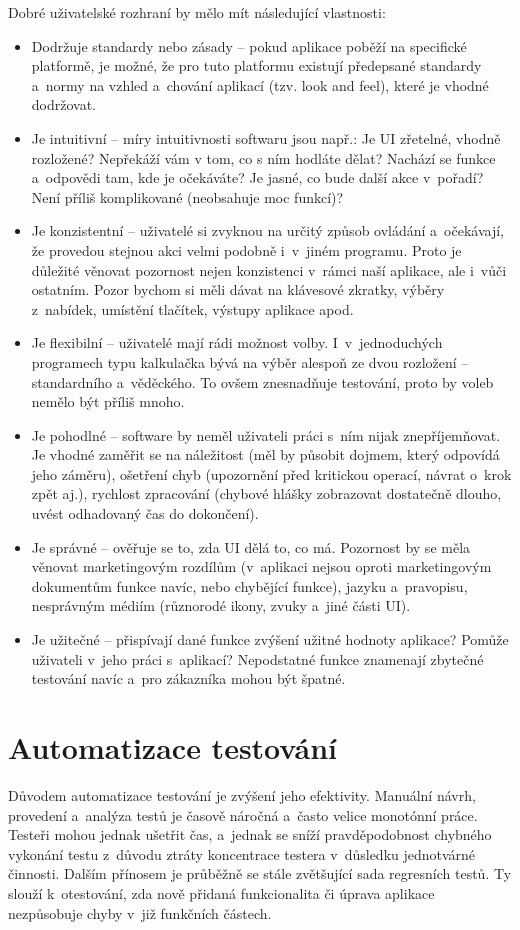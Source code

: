 		Dobré uživatelské rozhraní by mělo mít následující vlastnosti:
			\begin{itemize}
				\item Dodržuje standardy nebo zásady -- pokud aplikace poběží na specifické platformě, je možné, že pro tuto platformu existují předepsané standardy a~normy na vzhled a~chování aplikací (tzv. look and feel), které je vhodné dodržovat.
				\item Je intuitivní -- míry intuitivnosti softwaru jsou např.: Je UI zřetelné, vhodně rozložené? Nepřekáží vám v tom, co s ním hodláte dělat? Nachází se funkce a~odpovědi tam, kde je očekáváte? Je jasné, co bude další akce v~pořadí? Není příliš komplikované (neobsahuje moc funkcí)?
				\item Je konzistentní -- uživatelé si zvyknou na určitý způsob ovládání a~očekávají, že provedou stejnou akci velmi podobně i~v~jiném programu. Proto je důležité věnovat pozornost nejen konzistenci v~rámci naší aplikace, ale i~vůči ostatním. Pozor bychom si měli dávat na klávesové zkratky, výběry z~nabídek, umístění tlačítek, výstupy aplikace apod.
				\item Je flexibilní -- uživatelé mají rádi možnost volby. I~v~jednoduchých programech typu kalkulačka bývá na výběr alespoň ze dvou rozložení -- standardního a~věděckého. To ovšem znesnadňuje testování, proto by voleb nemělo být příliš mnoho.
				\item Je pohodlné -- software by neměl uživateli práci s~ním nijak znepříjemňovat. Je vhodné zaměřit se na náležitost (měl by působit dojmem, který odpovídá jeho záměru), ošetření chyb (upozornění před kritickou operací, návrat o~krok zpět aj.), rychlost zpracování (chybové hlášky zobrazovat dostatečně dlouho, uvést odhadovaný čas do dokončení).
				\item Je správné -- ověřuje se to, zda UI dělá to, co má. Pozornost by se měla věnovat marketingovým rozdílům (v~aplikaci nejsou oproti marketingovým dokumentům funkce navíc, nebo chybějící funkce), jazyku a~pravopisu, nesprávným médiím (různorodé ikony, zvuky a~jiné části UI).
				\item Je užitečné -- přispívají dané funkce zvýšení užitné hodnoty aplikace? Pomůže uživateli v~jeho práci s~aplikací? Nepodstatné funkce znamenají zbytečné testování navíc a~pro zákazníka mohou být špatné.
			\end{itemize}
		
		\section{Automatizace testování}
		Důvodem automatizace testování je zvýšení jeho efektivity. Manuální návrh, provedení a~analýza testů je časově náročná a~často velice monotónní práce. Testeři mohou jednak ušetřit čas, a~jednak se sníží pravděpodobnost chybného vykonání testu z~důvodu ztráty koncentrace testera v~důsledku jednotvárné činnosti. Dalším přínosem je průběžně se stále zvětšující sada regresních testů. Ty slouží k~otestování, zda nově přidaná funkcionalita či úprava aplikace nezpůsobuje chyby v~již funkčních částech.
		
